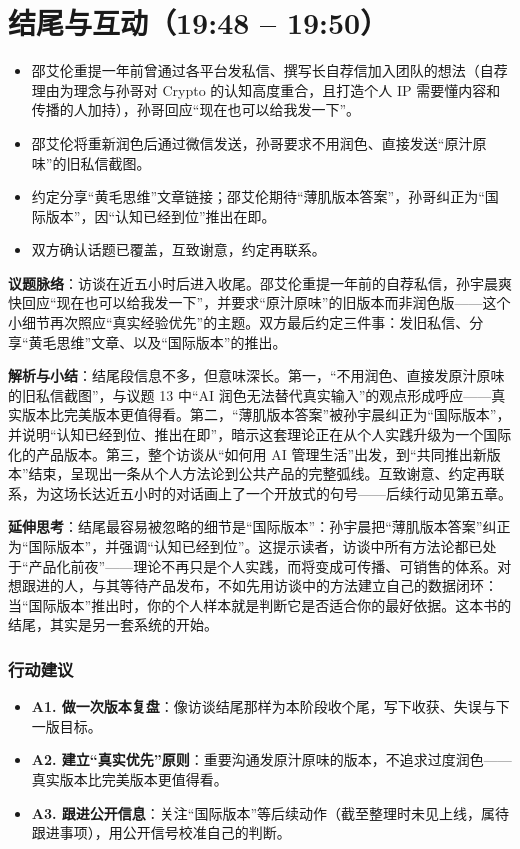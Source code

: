 \section{结尾与互动（19:48 --
19:50）}

\begin{itemize}
\tightlist
\item
  邵艾伦重提一年前曾通过各平台发私信、撰写长自荐信加入团队的想法（自荐理由为理念与孙哥对
  Crypto 的认知高度重合，且打造个人 IP
  需要懂内容和传播的人加持），孙哥回应``现在也可以给我发一下''。
\item
  邵艾伦将重新润色后通过微信发送，孙哥要求不用润色、直接发送``原汁原味''的旧私信截图。
\item
  约定分享``黄毛思维''文章链接；邵艾伦期待``薄肌版本答案''，孙哥纠正为``国际版本''，因``认知已经到位''推出在即。
\item
  双方确认话题已覆盖，互致谢意，约定再联系。
\end{itemize}

\textbf{议题脉络}：访谈在近五小时后进入收尾。邵艾伦重提一年前的自荐私信，孙宇晨爽快回应``现在也可以给我发一下''，并要求``原汁原味''的旧版本而非润色版------这个小细节再次照应``真实经验优先''的主题。双方最后约定三件事：发旧私信、分享``黄毛思维''文章、以及``国际版本''的推出。

\textbf{解析与小结}：结尾段信息不多，但意味深长。第一，``不用润色、直接发原汁原味的旧私信截图''，与议题
13 中``AI
润色无法替代真实输入''的观点形成呼应------真实版本比完美版本更值得看。第二，``薄肌版本答案''被孙宇晨纠正为``国际版本''，并说明``认知已经到位、推出在即''，暗示这套理论正在从个人实践升级为一个国际化的产品版本。第三，整个访谈从``如何用
AI
管理生活''出发，到``共同推出新版本''结束，呈现出一条从个人方法论到公共产品的完整弧线。互致谢意、约定再联系，为这场长达近五小时的对话画上了一个开放式的句号------后续行动见第五章。

\textbf{延伸思考}：结尾最容易被忽略的细节是``国际版本''：孙宇晨把``薄肌版本答案''纠正为``国际版本''，并强调``认知已经到位''。这提示读者，访谈中所有方法论都已处于``产品化前夜''------理论不再只是个人实践，而将变成可传播、可销售的体系。对想跟进的人，与其等待产品发布，不如先用访谈中的方法建立自己的数据闭环：当``国际版本''推出时，你的个人样本就是判断它是否适合你的最好依据。这本书的结尾，其实是另一套系统的开始。

\subsubsection{行动建议}

\begin{itemize}
\tightlist
\item
  \textbf{A1.
  做一次版本复盘}：像访谈结尾那样为本阶段收个尾，写下收获、失误与下一版目标。
\item
  \textbf{A2.
  建立``真实优先''原则}：重要沟通发原汁原味的版本，不追求过度润色------真实版本比完美版本更值得看。
\item
  \textbf{A3.
  跟进公开信息}：关注``国际版本''等后续动作（截至整理时未见上线，属待跟进事项），用公开信号校准自己的判断。
\end{itemize}

